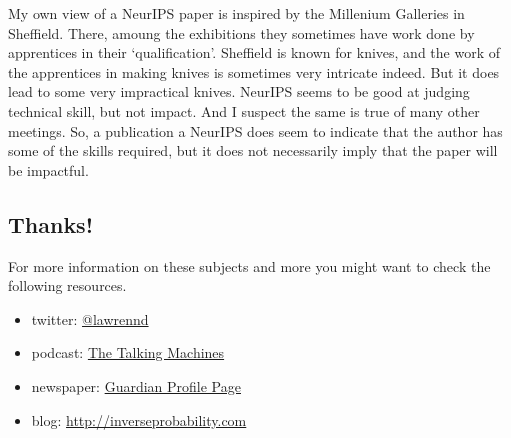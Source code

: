 My own view of a NeurIPS paper is inspired by the Millenium Galleries in
Sheffield. There, amoung the exhibitions they sometimes have work done
by apprentices in their `qualification'. Sheffield is known for knives,
and the work of the apprentices in making knives is sometimes very
intricate indeed. But it does lead to some very impractical knives.
NeurIPS seems to be good at judging technical skill, but not impact. And
I suspect the same is true of many other meetings. So, a publication a
NeurIPS does seem to indicate that the author has some of the skills
required, but it does not necessarily imply that the paper will be
impactful.

\hypertarget{thanks}{%
\subsection{Thanks!}\label{thanks}}

For more information on these subjects and more you might want to check
the following resources.

\begin{itemize}
\tightlist
\item
  twitter: \href{https://twitter.com/lawrennd}{@lawrennd}
\item
  podcast: \href{http://thetalkingmachines.com}{The Talking Machines}
\item
  newspaper:
  \href{http://www.theguardian.com/profile/neil-lawrence}{Guardian
  Profile Page}
\item
  blog:
  \href{http://inverseprobability.com/blog.html}{http://inverseprobability.com}
\end{itemize}

